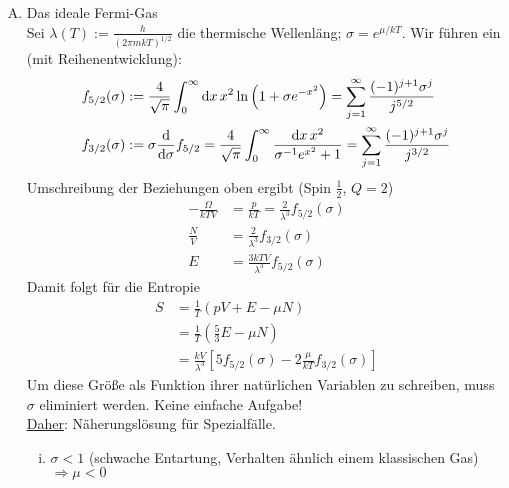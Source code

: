 \begin{enumerate}[A)]
    \item Das ideale Fermi-Gas \\
    Sei $\lambda(T) := \frac{h}{ \left( 2 \pi m k T \right)^{1/2} }$ die thermische Wellenläng; $\sigma = e^{\mu / kT}$. Wir führen ein (mit Reihenentwicklung):
    \begin{equation}
        \begin{split}
            f_{5/2}(\sigma) &:= \frac{4}{\sqrt{\pi}} \int_0^\infty \mathrm{d} x \, x^2 \ln \left( 1 + \sigma e^{-x^2} \right) = \sum_{j=1}^\infty \frac{(-1)^{j+1} \sigma^j}{j^{5/2}} \\
            f_{3/2}(\sigma) &:= \sigma \frac{\mathrm{d}}{\mathrm{d} \sigma} f_{5/2} = \frac{4}{\sqrt{\pi}} \int_0^\infty \frac{\mathrm{d} x \, x^2}{\sigma^{-1} e^{x^2} + 1} = \sum_{j=1}^{\infty} \frac{(-1)^{j+1} \sigma^j}{j^{3/2}}
        \end{split}
    \end{equation}
    Umschreibung der Beziehungen oben ergibt (Spin $\frac{1}{2}$, $Q = 2$)
    \begin{equation}
        \begin{split}
            - \frac{\Omega}{k T V} &= \frac{p}{k T} = \frac{2}{\lambda^3} f_{5/2} (\sigma) \\
            \frac{N}{V} &= \frac{2}{\lambda^3} f_{3/2} (\sigma) \\
            E &= \frac{3 k T V}{\lambda^3} f_{5/2} (\sigma)
        \end{split}
    \end{equation}
    Damit folgt für die Entropie
    \begin{equation}
        \begin{split}
            S &= \frac{1}{T} (p V + E - \mu N) \\
            &= \frac{1}{T} \left( \frac{5}{3}E - \mu N \right) \\
            &= \frac{k V}{\lambda^3} \left[ 5 f_{5/2}(\sigma) - 2 \frac{\mu}{k T} f_{3/2} (\sigma) \right]
        \end{split}
    \end{equation}
    Um diese Größe als Funktion ihrer natürlichen Variablen zu schreiben, muss $\sigma$ eliminiert werden. Keine einfache Aufgabe! \\
    \underline{Daher}: Näherungslösung für Spezialfälle.
    \begin{enumerate}[i)]
        \item $\sigma < 1$ (schwache Entartung, Verhalten ähnlich einem klassischen Gas) $\Rightarrow \mu < 0$

\end{enumerate}
\end{enumerate}
